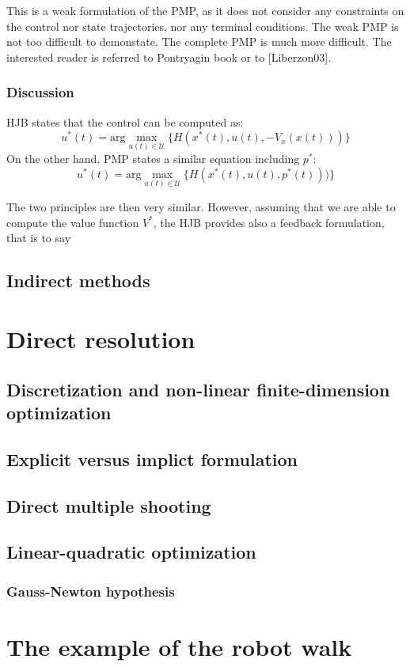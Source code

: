 \documentclass{book}
\begin{document}
This is a weak formulation of the PMP, as it does not consider any constraints on the control nor state trajectories, nor any terminal conditions. The weak PMP is not too difficult to demonstate. The complete PMP is much more difficult. The interested reader is referred to Pontryagin book or to [Liberzon03].

\subsection{Discussion}
HJB states that the control can be computed as:
$$ u^*(t) = \textrm{arg}\max_{u(t) \in \mathcal{U}} \Big\{ H(x^*(t),u(t),-V_x(x(t))) \Big\} $$
On the other hand, PMP states a similar equation including $p^*$:
$$ u^*(t) = \textrm{arg}\max_{u(t) \in \mathcal{U}} \Big\{ H(x^*(t),u(t),p^*(t))) \Big\} $$

The two principles are then very similar. However, assuming that we are able to compute the value function $V^*$, the HJB provides also a feedback formulation, that is to say 


\section{Indirect methods}


\chapter{Direct resolution}

\section{Discretization and non-linear finite-dimension optimization}
\section{Explicit versus implict formulation}
\section{Direct multiple shooting}
\section{Linear-quadratic optimization}
\subsection{Gauss-Newton hypothesis}

\chapter{The example of the robot walk}
\end{document}
